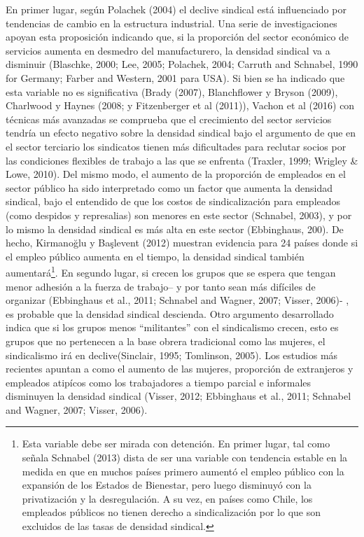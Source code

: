 \documentclass[
]{book}
\begin{document}
En primer lugar, según Polachek (2004) el declive sindical está influenciado por tendencias de cambio en la estructura industrial. Una serie de investigaciones apoyan esta proposición indicando que, si la proporción del sector económico de servicios aumenta en desmedro del manufacturero, la densidad sindical va a disminuir (Blaschke, 2000; Lee, 2005; Polachek, 2004; Carruth and Schnabel, 1990 for Germany; Farber and Western, 2001 para USA). Si bien se ha indicado que esta variable no es significativa (Brady (2007), Blanchflower y Bryson (2009), Charlwood y Haynes (2008; y Fitzenberger et al (2011)), Vachon et al (2016) con técnicas más avanzadas se comprueba que el crecimiento del sector servicios tendría un efecto negativo sobre la densidad sindical bajo el argumento de que en el sector terciario los sindicatos tienen más dificultades para reclutar socios por las condiciones flexibles de trabajo a las que se enfrenta (Traxler, 1999; Wrigley \& Lowe, 2010). Del mismo modo, el aumento de la proporción de empleados en el sector público ha sido interpretado como un factor que aumenta la densidad sindical, bajo el entendido de que los costos de sindicalización para empleados (como despidos y represalias) son menores en este sector (Schnabel, 2003), y por lo mismo la densidad sindical es más alta en este sector (Ebbinghaus, 200). De hecho, Kirmanoğlu y Başlevent (2012) muestran evidencia para 24 países donde si el empleo público aumenta en el tiempo, la densidad sindical también aumentará\footnote{Esta variable debe ser mirada con detención. En primer lugar, tal como señala Schnabel (2013) dista de ser una variable con tendencia estable en la medida en que en muchos países primero aumentó el empleo público con la expansión de los Estados de Bienestar, pero luego disminuyó con la privatización y la desregulación. A su vez, en países como Chile, los empleados públicos no tienen derecho a sindicalización por lo que son excluidos de las tasas de densidad sindical.}.
En segundo lugar, si crecen los grupos que se espera que tengan menor adhesión a la fuerza de trabajo-- y por tanto sean más difíciles de organizar (Ebbinghaus et al., 2011; Schnabel and Wagner, 2007; Visser, 2006)- , es probable que la densidad sindical descienda. Otro argumento desarrollado indica que si los grupos menos ``militantes'' con el sindicalismo crecen, esto es grupos que no pertenecen a la base obrera tradicional como las mujeres, el sindicalismo irá en declive(Sinclair, 1995; Tomlinson, 2005). Los estudios más recientes apuntan a como el aumento de las mujeres, proporción de extranjeros y empleados atipícos como los trabajadores a tiempo parcial e informales disminuyen la densidad sindical (Visser, 2012; Ebbinghaus et al., 2011; Schnabel and Wagner, 2007; Visser, 2006).
\end{document}
